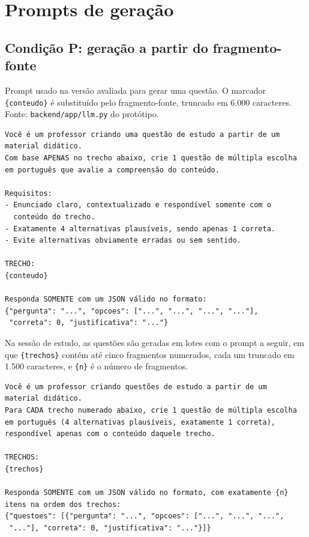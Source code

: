\documentclass[portuguese,oneside]{tcc}
\begin{document}



\appendix
\chapter{\label{ap:prompts}Prompts de geração}

\section{Condição P: geração a partir do fragmento-fonte}

Prompt usado na versão avaliada para gerar uma questão. O marcador \texttt{\{conteudo\}} é substituído pelo fragmento-fonte, truncado em 6.000 caracteres. Fonte: \texttt{backend/app/llm.py} do protótipo.

\begin{small}
\begin{verbatim}
Você é um professor criando uma questão de estudo a partir de um
material didático.
Com base APENAS no trecho abaixo, crie 1 questão de múltipla escolha
em português que avalie a compreensão do conteúdo.

Requisitos:
- Enunciado claro, contextualizado e respondível somente com o
  conteúdo do trecho.
- Exatamente 4 alternativas plausíveis, sendo apenas 1 correta.
- Evite alternativas obviamente erradas ou sem sentido.

TRECHO:
{conteudo}

Responda SOMENTE com um JSON válido no formato:
{"pergunta": "...", "opcoes": ["...", "...", "...", "..."],
 "correta": 0, "justificativa": "..."}
\end{verbatim}
\end{small}

Na sessão de estudo, as questões são geradas em lotes com o prompt a seguir, em que \texttt{\{trechos\}} contém até cinco fragmentos numerados, cada um truncado em 1.500 caracteres, e \texttt{\{n\}} é o número de fragmentos.

\begin{small}
\begin{verbatim}
Você é um professor criando questões de estudo a partir de um
material didático.
Para CADA trecho numerado abaixo, crie 1 questão de múltipla escolha
em português (4 alternativas plausíveis, exatamente 1 correta),
respondível apenas com o conteúdo daquele trecho.

TRECHOS:
{trechos}

Responda SOMENTE com um JSON válido no formato, com exatamente {n}
itens na ordem dos trechos:
{"questoes": [{"pergunta": "...", "opcoes": ["...", "...", "...",
 "..."], "correta": 0, "justificativa": "..."}]}
\end{verbatim}
\end{small}
\end{document}
